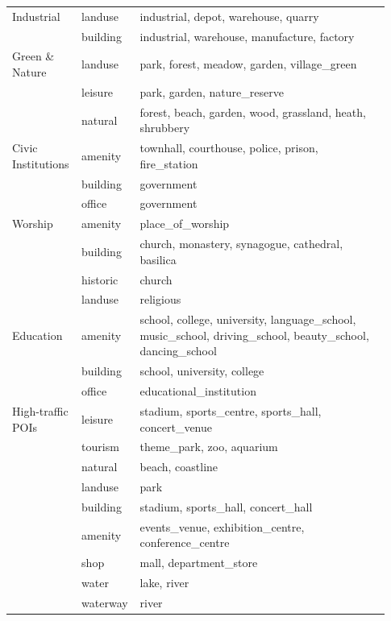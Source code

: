 \begin{scriptsize}
\begin{longtable}{p{0.18\linewidth} p{0.10\linewidth} p{0.65\linewidth}}
    Industrial
      & landuse  & industrial, depot, warehouse, quarry \\
      & building & industrial, warehouse, manufacture, factory \\
    \addlinespace

    Green \& Nature
      & landuse & park, forest, meadow, garden, village\_green \\
      & leisure & park, garden, nature\_reserve \\
      & natural & forest, beach, garden, wood, grassland, heath, shrubbery \\
    \addlinespace

    Civic Institutions
      & amenity  & townhall, courthouse, police, prison, fire\_station \\
      & building & government \\
      & office   & government \\
    \addlinespace

    Worship
      & amenity  & place\_of\_worship \\
      & building & church, monastery, synagogue, cathedral, basilica \\
      & historic & church \\
      & landuse  & religious \\
    \addlinespace

    Education
      & amenity  & school, college, university, language\_school, music\_school, driving\_school, beauty\_school, dancing\_school \\
      & building & school, university, college \\
      & office   & educational\_institution \\
    \addlinespace

    High-traffic POIs
      & leisure  & stadium, sports\_centre, sports\_hall, concert\_venue \\
      & tourism  & theme\_park, zoo, aquarium \\
      & natural  & beach, coastline \\
      & landuse  & park \\
      & building & stadium, sports\_hall, concert\_hall \\
      & amenity  & events\_venue, exhibition\_centre, conference\_centre \\
      & shop     & mall, department\_store \\
      & water    & lake, river \\
      & waterway & river \\
  \end{longtable}
  \end{scriptsize}


